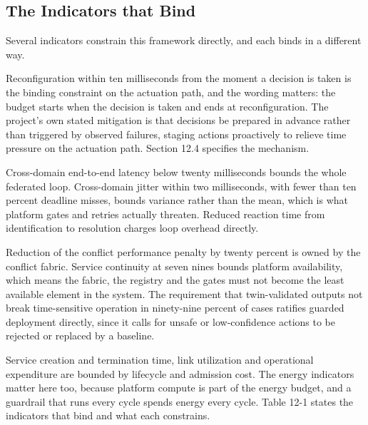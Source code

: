 \hypertarget{the-indicators-that-bind}{%
\subsection{The Indicators that Bind}\label{the-indicators-that-bind}}

Several indicators constrain this framework directly, and each binds in
a different way.

Reconfiguration within ten milliseconds from the moment a decision is
taken is the binding constraint on the actuation path, and the wording
matters: the budget starts when the decision is taken and ends at
reconfiguration. The project's own stated mitigation is that decisions
be prepared in advance rather than triggered by observed failures,
staging actions proactively to relieve time pressure on the actuation
path. Section 12.4 specifies the mechanism.

Cross-domain end-to-end latency below twenty milliseconds bounds the
whole federated loop. Cross-domain jitter within two milliseconds, with
fewer than ten percent deadline misses, bounds variance rather than the
mean, which is what platform gates and retries actually threaten.
Reduced reaction time from identification to resolution charges loop
overhead directly.

Reduction of the conflict performance penalty by twenty percent is owned
by the conflict fabric. Service continuity at seven nines bounds
platform availability, which means the fabric, the registry and the
gates must not become the least available element in the system. The
requirement that twin-validated outputs not break time-sensitive
operation in ninety-nine percent of cases ratifies guarded deployment
directly, since it calls for unsafe or low-confidence actions to be
rejected or replaced by a baseline.

Service creation and termination time, link utilization and operational
expenditure are bounded by lifecycle and admission cost. The energy
indicators matter here too, because platform compute is part of the
energy budget, and a guardrail that runs every cycle spends energy every
cycle. Table 12-1 states the indicators that bind and what each
constrains.

